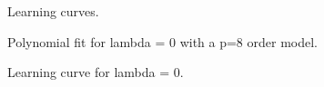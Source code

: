 \documentclass{article}
\begin{document}
\begin{figure}[h]
  \caption{Learning curves.}\label{fig:8}
\end{figure}

\begin{figure}[h]
  \caption{Polynomial fit for lambda = 0 with a p=8 order model.}\label{fig:9}
\end{figure}

\begin{figure}[h]
  \caption{Learning curve for lambda = 0.}\label{fig:10}
\end{figure}
\end{document}
